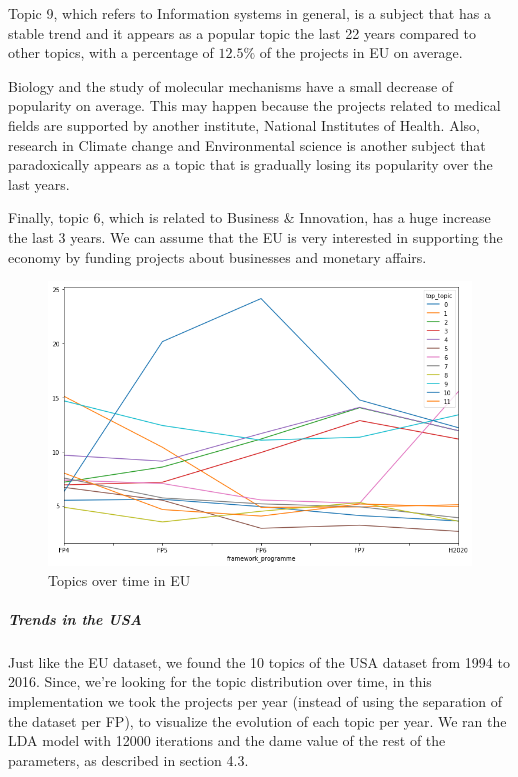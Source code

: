 \documentclass[12pt]{report}
\begin{document}
Topic 9, which refers to Information systems in general, is a subject that has a
stable trend and it appears as a popular topic the last 22 years compared to
other topics, with a percentage of $12.5\%$ of the projects in EU on average.

Biology and the study of molecular mechanisms have a small decrease of
popularity on average. This may happen because the projects related to medical
fields are supported by another institute, National Institutes of Health. Also,
research in Climate change and Environmental science is another subject that
paradoxically appears as a topic that is gradually losing its popularity over
the last years.

Finally, topic 6, which is related to Business \& Innovation, has a huge
increase the last 3 years. We can assume that the EU is very interested in
supporting the economy by funding projects about businesses and monetary
affairs.
\begin{center}
\begin{figure}
\includegraphics[width=1.0\textwidth]
{figs/eu-topic-evolution.png}
\caption{Topics over time in EU}
\end{figure}
\end{center}
\subparagraph{Trends in the USA	}

Just like the EU dataset, we found the 10 topics of the USA dataset from 1994 to
2016. Since, we're looking for the topic distribution over time, in this
implementation we took the projects per year (instead of using the separation of
the dataset per FP), to visualize the evolution of each topic per year. We ran
the LDA model with 12000 iterations and the dame value of the rest of the
parameters, as described in section 4.3.
\end{document}

